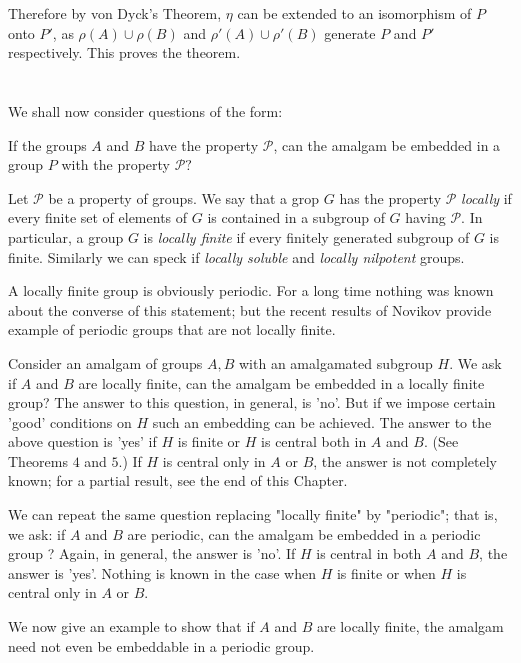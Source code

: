 Therefore by von Dyck's Theorem, $\eta$ can be extended to an
isomorphism of $P$ onto $P'$, as $\rho(A) \cup \rho (B)$ and $\rho
'(A) \cup \rho' (B)$ generate $P$ and $P'$ respectively. This proves
the theorem.	 

\section{}%

We shall now consider questions of the form:

If the groups $A$ and $B$ have the property $\mathcal{P}$, can the
amalgam be embedded in a group $P$ with the property $\mathcal{P} ?$ 

Let $\mathcal{P}$ be a property of groups. We say that a grop $G$ has
the property $\mathcal{P}$ \textit{locally} if every finite set of
elements of $G$ is contained in a subgroup of $G$ having
$\mathcal{P}$. In particular, a group $G$ is \textit{locally finite}
if every finitely generated subgroup of $G$ is finite. Similarly we
can speck if \textit{locally soluble} and \textit{locally nilpotent }
groups. 

A locally finite group is obviously periodic. For a long time nothing
was known about the converse of this statement; but the recent results
of Novikov provide example of periodic groups that are not locally
finite. 

Consider an amalgam of groups $A, B$ with an amalgamated subgroup
$H$. We ask if $A$ and $B$ are locally finite, can the amalgam be
embedded in a locally finite group? The answer to this question, in
general, is 'no'. But if we impose certain 'good' conditions on $H$
such an embedding can be achieved. The answer to the above question is
'yes' if $H$ is finite or $H$ is central both in $A$ and $B$. (See
Theorems $4$ and $5$.) If $H$ is central only in $A$ or $B$,  the
answer is not completely known; for a partial result, see the end of
this Chapter.  

We can repeat the same question replacing "locally finite"  by
"periodic"; that is, we ask: if $A$ and $B$ are periodic, can the
amalgam be embedded in a periodic group ? Again, in general, the
answer is 'no'. If $H$ is central in both $A$ and $B$, the answer is
'yes'. Nothing is known in the case when $H$ is finite or when $H$ is
central only in $A$ or $B$. 

We now give an example to show that if $A$ and $B$ are locally finite,
the amalgam need not even be embeddable in a periodic group. 

